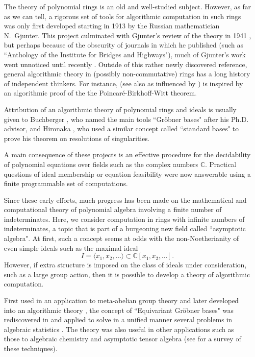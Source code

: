 
The theory of polynomial rings is an old and well-studied subject.  However, as far as we can tell, a rigorous set of tools for algorithmic computation in such rings was only first developed starting in 1913 \cite{gjunter1913} by the Russian mathematician N.~Gjunter.  This project culminated with Gjunter's review of the theory in 1941 \cite{gunther1941modules}, but perhaps because of the obscurity of journals in which he published (such as ``Anthology of the Institute for Bridges and Highways"), much of Gjunter's work went unnoticed until recently \cite{renschuch2003contributions}.  Outside of this rather newly discovered reference, general algorithmic theory in (possibly non-commutative) rings has a long history of independent thinkers.  For instance, \cite{bergman1978diamond} (see also \cite{bokut1976embeddings} as influenced by \cite{shirshov1962some}) is inspired by an algorithmic proof of the the Poincar\'e-Birkhoff-Witt theorem.  

Attribution of an algorithmic theory of polynomial rings and ideals is usually given to Buchberger \cite{buchberger1965algorithmus}, who named the main tools ``Gr\"obner bases" after his Ph.D. advisor, and Hironaka \cite{hironaka1964resolution}, who used a similar concept called ``standard bases" to prove his theorem on resolutions of singularities.  

A main consequence of these projects is an effective procedure for the decidability of polynomial equations over fields such as the complex numbers $\mathbb{C}$.  Practical questions of ideal membership or equation feasibility were now answerable using a finite programmable set of computations.  

Since these early efforts, much progress has been made on the mathematical and computational theory of polynomial algebra involving a finite number of indeterminates.  Here, we consider computation in rings with infinite numbers of indeterminates, a topic that is part of a burgeoning new field called ``asymptotic algebra".  At first, such a concept seems at odds with the non-Noetherianity of even simple ideals such as the maximal ideal \[I = \langle x_1, x_2, \ldots  \rangle \subset \mathbb C[x_1, x_2,\ldots].\]
However, if extra structure is imposed on the class of ideals under consideration, such as a large group action, then it is possible to develop a theory of algorithmic computation.  

First used in an application to meta-abelian group theory \cite{cohen1967laws} and later developed into an algorithmic theory \cite{Emmott, Cohen87}, the concept of ``Equivariant Gr\"obner bases" was rediscovered in \cite{aschenbrenner2007finite} and applied to solve in a unified manner several problems in algebraic statistics \cite{hillar2012finite}.  The theory was also useful in other applications such as those to algebraic chemistry \cite{Draisma08b} and asymptotic tensor algebra \cite{draisma2014bounded} (see \cite{draisma2014noetherianity} for a survey of these techniques).

